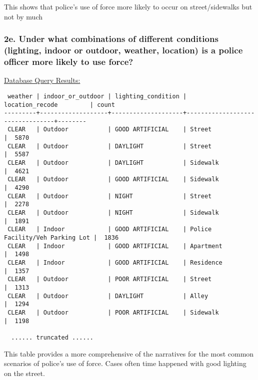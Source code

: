 \documentclass[10pt]{article}
\begin{document}
This shows that police's use of force more likely to occur on street/sidewalks but not by much

\subsubsection*{2e. Under what combinations of different conditions (lighting, indoor or outdoor, weather, location) is a police officer more likely to use force?}

\underline{Database Query Results:}

\begin{verbatim}
 weather | indoor_or_outdoor | lighting_condition |         location_recode         | count
---------+-------------------+--------------------+---------------------------------+--------
 CLEAR   | Outdoor           | GOOD ARTIFICIAL    | Street                          |  5870
 CLEAR   | Outdoor           | DAYLIGHT           | Street                          |  5587
 CLEAR   | Outdoor           | DAYLIGHT           | Sidewalk                        |  4621
 CLEAR   | Outdoor           | GOOD ARTIFICIAL    | Sidewalk                        |  4290
 CLEAR   | Outdoor           | NIGHT              | Street                          |  2278
 CLEAR   | Outdoor           | NIGHT              | Sidewalk                        |  1891
 CLEAR   | Indoor            | GOOD ARTIFICIAL    | Police Facility/Veh Parking Lot |  1836
 CLEAR   | Indoor            | GOOD ARTIFICIAL    | Apartment                       |  1498
 CLEAR   | Indoor            | GOOD ARTIFICIAL    | Residence                       |  1357
 CLEAR   | Outdoor           | POOR ARTIFICIAL    | Street                          |  1313
 CLEAR   | Outdoor           | DAYLIGHT           | Alley                           |  1294
 CLEAR   | Outdoor           | POOR ARTIFICIAL    | Sidewalk                        |  1198

  ...... truncated ......
\end{verbatim}

This table provides a more comprehensive of the narratives for the most common scenarios of police's use of force. Cases often time happened with good lighting on the street.
\end{document}
